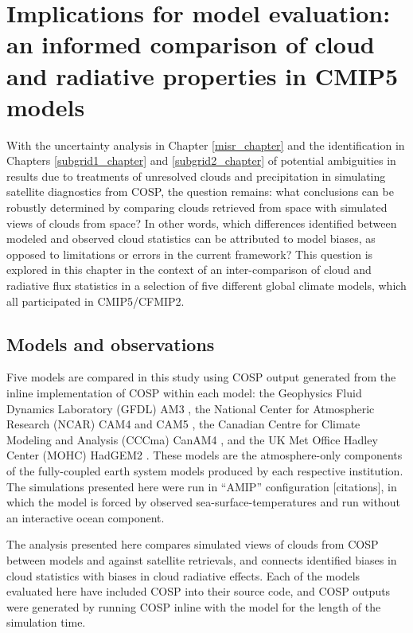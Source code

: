\chapter{Implications for model evaluation: an informed comparison of cloud and
radiative properties in CMIP5 models}\label{cmip5_chapter}
With the uncertainty analysis in Chapter \ref{misr_chapter} and the identification in Chapters \ref{subgrid1_chapter} and \ref{subgrid2_chapter} of potential ambiguities in results due to treatments of unresolved clouds and precipitation in simulating satellite diagnostics from COSP, the question remains: what conclusions can be robustly determined by comparing clouds retrieved from space with simulated views of clouds from space? In other words, which differences identified between modeled and observed cloud statistics can be attributed to model biases, as opposed to limitations or errors in the current framework? This question is explored in this chapter in the context of an inter-comparison of cloud and radiative flux statistics in a selection of five different global climate models, which all participated in CMIP5/CFMIP2.

\section{Models and observations}
Five models are compared in this study using COSP output generated from the inline implementation of COSP within each model: the Geophysics Fluid Dynamics Laboratory (GFDL) AM3 \citep{donner_et_al_2011}, the National Center for Atmospheric Research (NCAR) CAM4 \citep{neale_et_al_2010a} and CAM5 \citep{neale_et_al_2010b}, the Canadian Centre for Climate Modeling and Analysis (CCCma) CanAM4 \citep{von_salzen_et_al_2012}, and the UK Met Office Hadley Center (MOHC) HadGEM2 \citep{martin_et_al_2011}. These models are the atmosphere-only components of the fully-coupled earth system models produced by each respective institution. The simulations presented here were run in ``AMIP'' configuration [citations], in which the model is forced by observed sea-surface-temperatures and run without an interactive ocean component.

The analysis presented here compares simulated views of clouds from COSP between models and against satellite retrievals, and connects identified biases in cloud statistics with biases in cloud radiative effects. Each of the models evaluated here have included COSP into their source code, and COSP outputs were generated by running COSP inline with the model for the length of the simulation time. 

